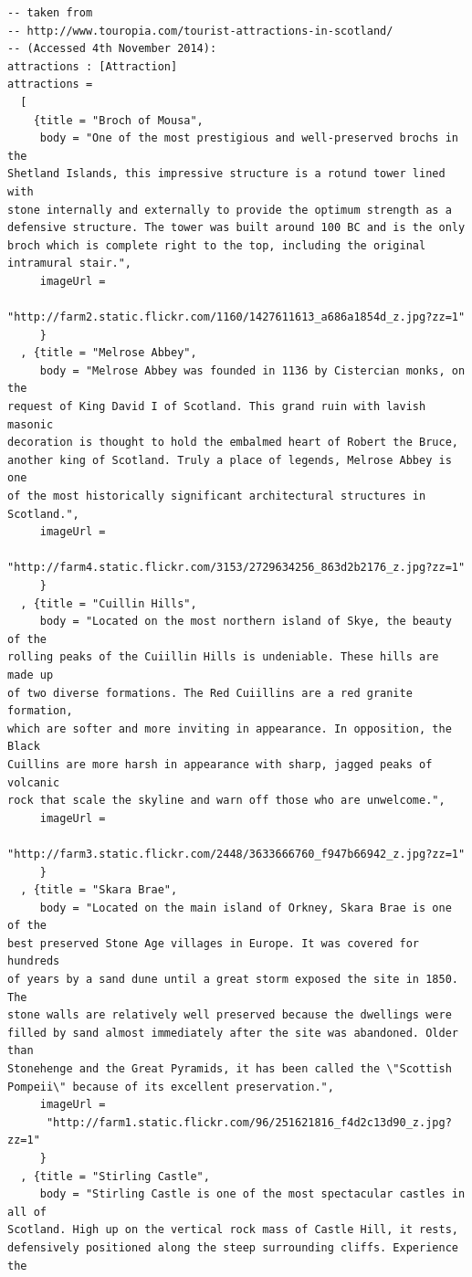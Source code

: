 \documentclass[12pt]{article}
\begin{document}
\begin{appendices}
\begin{verbatim}
-- taken from 
-- http://www.touropia.com/tourist-attractions-in-scotland/ 
-- (Accessed 4th November 2014):
attractions : [Attraction]
attractions = 
  [
    {title = "Broch of Mousa",
     body = "One of the most prestigious and well-preserved brochs in the 
Shetland Islands, this impressive structure is a rotund tower lined with 
stone internally and externally to provide the optimum strength as a 
defensive structure. The tower was built around 100 BC and is the only 
broch which is complete right to the top, including the original 
intramural stair.",
     imageUrl = 
      "http://farm2.static.flickr.com/1160/1427611613_a686a1854d_z.jpg?zz=1"
     }
  , {title = "Melrose Abbey",
     body = "Melrose Abbey was founded in 1136 by Cistercian monks, on the 
request of King David I of Scotland. This grand ruin with lavish masonic 
decoration is thought to hold the embalmed heart of Robert the Bruce, 
another king of Scotland. Truly a place of legends, Melrose Abbey is one 
of the most historically significant architectural structures in Scotland.",
     imageUrl = 
      "http://farm4.static.flickr.com/3153/2729634256_863d2b2176_z.jpg?zz=1"
     }
  , {title = "Cuillin Hills",
     body = "Located on the most northern island of Skye, the beauty of the 
rolling peaks of the Cuiillin Hills is undeniable. These hills are made up 
of two diverse formations. The Red Cuiillins are a red granite formation, 
which are softer and more inviting in appearance. In opposition, the Black 
Cuillins are more harsh in appearance with sharp, jagged peaks of volcanic 
rock that scale the skyline and warn off those who are unwelcome.",
     imageUrl = 
      "http://farm3.static.flickr.com/2448/3633666760_f947b66942_z.jpg?zz=1"
     }
  , {title = "Skara Brae",
     body = "Located on the main island of Orkney, Skara Brae is one of the 
best preserved Stone Age villages in Europe. It was covered for hundreds 
of years by a sand dune until a great storm exposed the site in 1850. The 
stone walls are relatively well preserved because the dwellings were 
filled by sand almost immediately after the site was abandoned. Older than
Stonehenge and the Great Pyramids, it has been called the \"Scottish 
Pompeii\" because of its excellent preservation.",
     imageUrl = 
      "http://farm1.static.flickr.com/96/251621816_f4d2c13d90_z.jpg?zz=1"
     }
  , {title = "Stirling Castle",
     body = "Stirling Castle is one of the most spectacular castles in all of 
Scotland. High up on the vertical rock mass of Castle Hill, it rests, 
defensively positioned along the steep surrounding cliffs. Experience the 

\end{verbatim}
\end{appendices}
\end{document}
